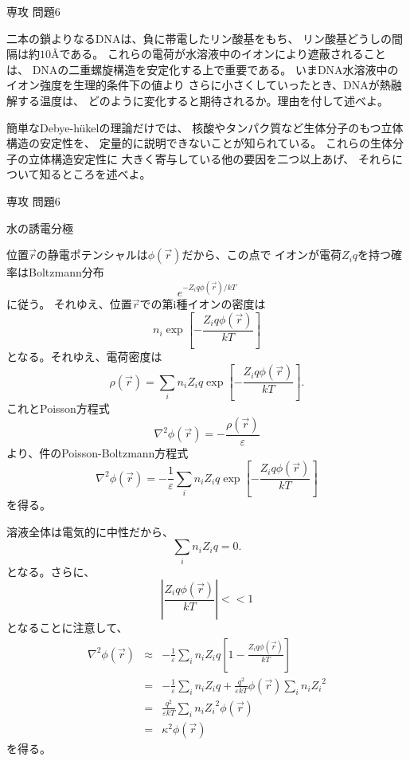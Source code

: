 \documentclass[fleqn]{jbook}
\begin{document}
\begin{question}{専攻 問題6}{}
\begin{subquestions}
\SubQuestion
二本の鎖よりなるDNAは、負に帯電したリン酸基をもち、
リン酸基どうしの間隔は約$10\mbox{\AA}$である。
これらの電荷が水溶液中のイオンにより遮蔽されることは、
DNAの二重螺旋構造を安定化する上で重要である。
いまDNA水溶液中のイオン強度を生理的条件下の値より
さらに小さくしていったとき、DNAが熱融解する温度は、
どのように変化すると期待されるか。理由を付して述べよ。

\SubQuestion
簡単なDebye-h\"ukelの理論だけでは、
核酸やタンパク質など生体分子のもつ立体構造の安定性を、
定量的に説明できないことが知られている。
これらの生体分子の立体構造安定性に
大きく寄与している他の要因を二つ以上あげ、
それらについて知るところを述べよ。

\end{subquestions}
\end{question}
\begin{answer}{専攻 問題6}{}

\begin{subanswers}
\SubAnswer

水の誘電分極

\SubAnswer

位置$\Vec r$の静電ポテンシャルは$\phi(\Vec r)$だから、この点で
イオンが電荷$Z_i q$を持つ確率はBoltzmann分布
\[ e^{-Z_i q \phi(\Vec r)/kT} \]
に従う。
それゆえ、位置$\Vec r$での第i種イオンの密度は
\[ n_i \exp\left[- \frac{Z_i q \phi(\Vec r)}{kT} \right] \]
となる。それゆえ、電荷密度は
\[ \rho(\Vec r) = \sum_i n_i Z_i q \exp \left[ - \frac{Z_i q \phi(\Vec r)}
{kT} \right]. \]
これとPoisson方程式
\[ \nabla^2 \phi( \Vec r) = - \frac{\rho(\Vec r)}{\varepsilon} \]
より、件のPoisson-Boltzmann方程式
\[
\nabla^2 \phi(\Vec r) = -\frac{1}{\varepsilon} \sum_i n_i Z_i q
\exp \left[ - \frac{Z_i q \phi(\Vec r)}{kT} \right]
\]
を得る。

\SubAnswer

 溶液全体は電気的に中性だから、
\[ \sum_i n_i Z_i q = 0.\]
となる。さらに、
\[\left| \frac{Z_i q \phi(\Vec r)}{kT} \right|  << 1\]
となることに注意して、
\begin{eqnarray*}
\nabla^2 \phi(\Vec r) & \approx &-\frac{1}{\varepsilon} \sum_i
n_i Z_i q \left[ 1 - \frac{Z_i q \phi(\Vec r)}{kT} \right] \\
&=& -\frac{1}{\varepsilon} \sum_i n_i Z_i q + \frac{q^2}{\varepsilon kT}
\phi(\Vec r) \sum_i n_i {Z_i}^2 \\
&=&  \frac{q^2}{\varepsilon kT} \sum_i n_i {Z_i}^2 \phi(\Vec r) \\
&=& \kappa^2 \phi(\Vec r)
\end{eqnarray*}
を得る。


\end{subanswers}
\end{answer}
\end{document}
